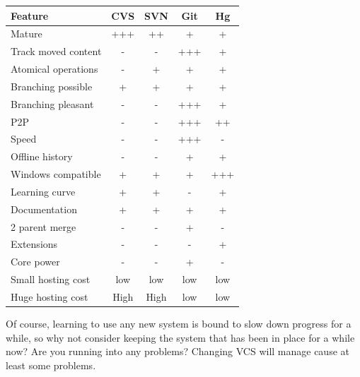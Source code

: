 \begin{tabular}{|l|c|c|c|c|}
\hline
Feature             & CVS & SVN & Git & Hg\\
\hline
Mature              & +++ & ++  &  +  & + \\
Track moved content &  -  &  -  & +++ & + \\ %
Atomical operations &  -  &  +  &  +  & + \\ 
Branching possible  &  +  &  +  &  +  & + \\
Branching pleasant  &  -  &  -  & +++ & + \\
P2P                 &  -  &  -  & +++ & ++\\ %
Speed               &  -  &  -  & +++ & - \\
Offline history     &  -  &  -  &  +  & + \\
Windows compatible  &  +  &  +  &  +  &+++\\
Learning curve      &  +  &  +  &  -  & + \\
Documentation       &  +  &  +  &  +  & + \\ %
2 parent merge      &  -  &  -  &  +  & - \\
Extensions          &  -  &  -  &  -  & + \\
Core power          &  -  &  -  &  +  & - \\
Small hosting cost  & low & low & low &low\\
Huge hosting cost   &High &High &low&low\\
\hline
\end{tabular}


Of course, learning to use any new system is bound to slow down progress for a while, so why not consider 
keeping the system that has been in place for a while now? Are you running into any problems? Changing VCS
will manage cause at least some problems.

